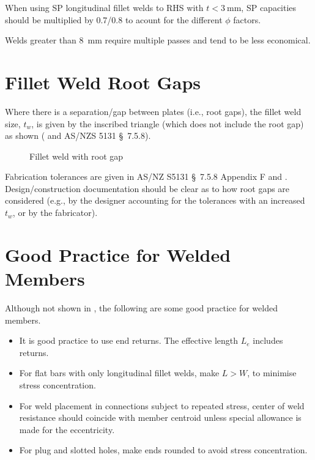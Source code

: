 When using SP longitudinal fillet welds to RHS with $t<\SI{3}{\mm}$, SP capacities should be multiplied by \num{0.7}/\num{0.8} to acount for the different $\phi$ factors.

Welds greater than \SI{8}{\mm} require multiple passes and tend to be less economical.
\section{Fillet Weld Root Gaps}
Where there is a separation/gap between plates (i.e., root gaps), the fillet weld size, $t_w$, is given by the inscribed triangle (which does not include the root gap) as shown ( and AS/NZS 5131 \S~7.5.8).
\begin{figure}[H]
\centering
\caption{Fillet weld with root gap}
\end{figure}

Fabrication tolerances are given in AS/NZ S5131 \S~7.5.8 Appendix F and . Design/construction documentation should be clear as to how root gaps are considered (e.g., by the designer accounting for the tolerances with an increased $t_w$, or by the fabricator). 
\section{Good Practice for Welded Members}
Although not shown in \NZSSTEEL{}, the following are some good practice for welded members.
\begin{itemize}
\item It is good practice to use end returns. The effective length $L_e$ includes returns.
\begin{figure}[H]
\centering
\end{figure}
\item For flat bars with only longitudinal fillet welds, make $L>W$, to minimise stress concentration.
\begin{figure}[H]
\centering
\end{figure}
\item For weld placement in connections subject to repeated stress, center of weld resistance should coincide with member centroid unless special allowance is made for the eccentricity.
\begin{figure}[H]
\centering
\end{figure}
\item For plug and slotted holes, make ends rounded to avoid stress concentration.
\begin{figure}[H]
\centering
\end{figure}
\end{itemize}
